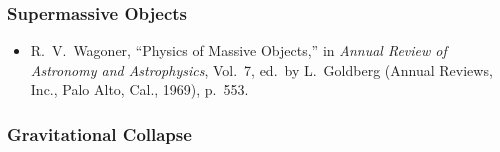 \subsubsection*{Supermassive Objects}

\begin{itemize}
  \item[\(\square\)] R.~V.~Wagoner, ``Physics of Massive Objects,'' in
  \emph{Annual Review of Astronomy and Astrophysics}, Vol.~7, ed.\ by
  L.~Goldberg (Annual Reviews, Inc., Palo Alto, Cal., 1969), p.~553.
\end{itemize}

\subsubsection*{Gravitational Collapse}

